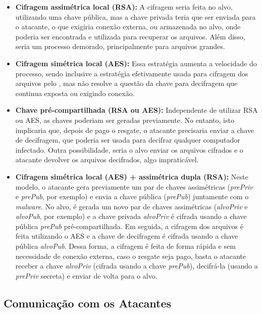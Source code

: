 \documentclass[12pt]{article}
\begin{document}
\begin{itemize}
\item \textbf{Cifragem assimétrica local (RSA):} A cifragem seria feita no alvo, utilizando uma chave pública, mas a chave privada teria que ser enviada para o atacante, o que exigiria conexão externa, ou armazenada no alvo, onde poderia ser encontrada e utilizada para recuperar os arquivos. Além disso, seria um processo demorado, principalmente para arquivos grandes.

\item \textbf{Cifragem simétrica local (AES):} Essa estratégia aumenta a velocidade do processo, sendo inclusive a estratégia efetivamente usada para cifragem dos arquivos pelo , mas não resolve a questão da chave para decifragem que continua exposta ou exigindo conexão.

\item \textbf{Chave pré-compartilhada (RSA ou AES):} Independente de utilizar RSA ou AES, as chaves poderiam ser geradas previamente. No entanto, isto implicaria que, depois de pago o resgate, o atacante precisaria enviar a chave de decifragem, que poderia ser usada para decifrar qualquer computador infectado. Outra possibilidade, seria o alvo enviar os arquivos cifrados e o atacante devolver os arquivos decifrados, algo impraticável.

\item  \textbf{Cifragem simétrica local (AES) + assimétrica dupla (RSA):} Neste modelo, o atacante gera previamente um par de chaves assimétricas (\textit{prePriv} e \textit{prePub}, por exemplo) e envia a chave pública (\textit{prePub}) juntamente com o \textit{malware}. No alvo, é gerada um novo par de chaves assimétricas (\textit{alvoPriv} e \textit{alvoPub}, por exemplo) e a chave privada \textit{alvoPriv} é cifrada usando a chave pública \textit{prePub} pré-compartilhada. Em seguida, a cifragem dos arquivos é feita utilizando o AES e a chave de decifragem é cifrada usando a chave pública \textit{alvoPub}.
Dessa forma, a cifragem é feita de forma rápida e sem necessidade de conexão externa, caso o resgate seja pago, basta o atacante receber a chave \textit{alvoPriv} (cifrada usando a chave \textit{prePub}), decifrá-la (usando a \textit{prePriv} secreta) e enviar de volta para o alvo. 

\end{itemize}

\subsection{Comunicação com os Atacantes}
\end{document}
